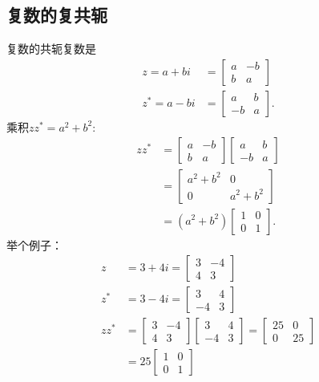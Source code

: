 \subsection{复数的复共轭}
复数的共轭复数是
$$
\begin{aligned}
z=a+b i & =\left[\begin{array}{cc}
a & -b \\
b & a
\end{array}\right] \\
z^{*}=a-b i & =\left[\begin{array}{cc}
a & b \\
-b & a
\end{array}\right] .
\end{aligned}
$$
乘积$z z^{*}=a^{2}+b^{2}$:
$$
\begin{aligned}
z z^{*} & =\left[\begin{array}{cc}
a & -b \\
b & a
\end{array}\right]\left[\begin{array}{cc}
a & b \\
-b & a
\end{array}\right] \\
& =\left[\begin{array}{cc}
a^{2}+b^{2} & 0 \\
0 & a^{2}+b^{2}
\end{array}\right] \\
& =\left(a^{2}+b^{2}\right)\left[\begin{array}{ll}
1 & 0 \\
0 & 1
\end{array}\right] .
\end{aligned}
$$
举个例子：
$$
\begin{aligned}
z & =3+4 i=\left[\begin{array}{cc}
3 & -4 \\
4 & 3
\end{array}\right] \\
z^{*} & =3-4 i=\left[\begin{array}{cc}
3 & 4 \\
-4 & 3
\end{array}\right] \\
z z^{*} & =\left[\begin{array}{cc}
3 & -4 \\
4 & 3
\end{array}\right]\left[\begin{array}{cc}
3 & 4 \\
-4 & 3
\end{array}\right]=\left[\begin{array}{cc}
25 & 0 \\
0 & 25
\end{array}\right] \\
& =25\left[\begin{array}{cc}
1 & 0 \\
0 & 1
\end{array}\right]
\end{aligned}
$$

